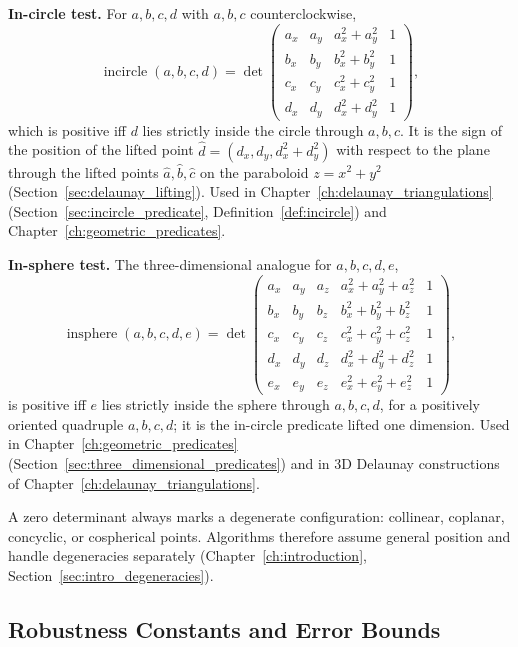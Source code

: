 \medskip\noindent\textbf{In-circle test.}
For $a, b, c, d$ with $a, b, c$ counterclockwise,
\[
  \operatorname{incircle}(a,b,c,d) =
  \det\begin{pmatrix}
    a_x & a_y & a_x^2 + a_y^2 & 1\\
    b_x & b_y & b_x^2 + b_y^2 & 1\\
    c_x & c_y & c_x^2 + c_y^2 & 1\\
    d_x & d_y & d_x^2 + d_y^2 & 1
  \end{pmatrix},
\]
which is positive iff $d$ lies strictly inside the circle through
$a, b, c$. It is the sign of the position of the lifted point
$\hat d = (d_x, d_y, d_x^2 + d_y^2)$ with respect to the plane through the
lifted points $\hat a, \hat b, \hat c$ on the paraboloid
$z = x^2 + y^2$ (Section~\ref{sec:delaunay_lifting}). Used in
Chapter~\ref{ch:delaunay_triangulations} (Section~\ref{sec:incircle_predicate},
Definition~\ref{def:incircle}) and Chapter~\ref{ch:geometric_predicates}.

\medskip\noindent\textbf{In-sphere test.}
The three-dimensional analogue for $a, b, c, d, e$,
\[
  \operatorname{insphere}(a,b,c,d,e) =
  \det\begin{pmatrix}
    a_x & a_y & a_z & a_x^2+a_y^2+a_z^2 & 1\\
    b_x & b_y & b_z & b_x^2+b_y^2+b_z^2 & 1\\
    c_x & c_y & c_z & c_x^2+c_y^2+c_z^2 & 1\\
    d_x & d_y & d_z & d_x^2+d_y^2+d_z^2 & 1\\
    e_x & e_y & e_z & e_x^2+e_y^2+e_z^2 & 1
  \end{pmatrix},
\]
is positive iff $e$ lies strictly inside the sphere through $a, b, c, d$,
for a positively oriented quadruple $a, b, c, d$; it is the in-circle
predicate lifted one dimension. Used in Chapter~\ref{ch:geometric_predicates}
(Section~\ref{sec:three_dimensional_predicates}) and in 3D Delaunay
constructions of Chapter~\ref{ch:delaunay_triangulations}.

A zero determinant always marks a degenerate configuration: collinear,
coplanar, concyclic, or cospherical points. Algorithms therefore assume
general position and handle degeneracies separately
(Chapter~\ref{ch:introduction}, Section~\ref{sec:intro_degeneracies}).

\subsection{Robustness Constants and Error Bounds}
\label{sec:appform_robustness}

